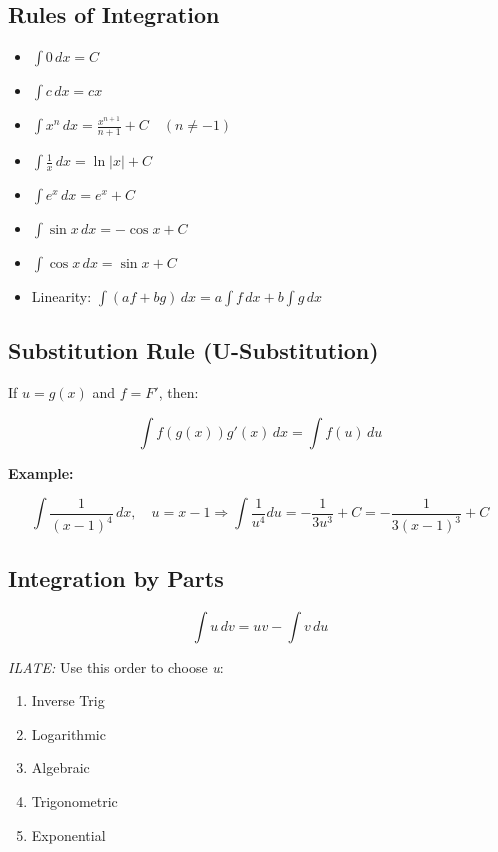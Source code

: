 \subsection{Rules of Integration}

\begin{itemize}

    \item \(\int 0\,dx = C\)

    \item \(\int c\,dx = cx\)

    \item \(\int x^n\,dx = \frac{x^{n+1}}{n+1} + C \quad (n \ne -1)\)

    \item \(\int \frac{1}{x}\,dx = \ln|x| + C\)

    \item \(\int e^x\,dx = e^x + C\)

    \item \(\int \sin x\,dx = -\cos x + C\)

    \item \(\int \cos x\,dx = \sin x + C\)

    \item Linearity: \(\int (af + bg)\,dx = a\int f\,dx + b\int g\,dx\)

\end{itemize}

\subsection{Substitution Rule (U-Substitution)}

If \(u = g(x)\) and \(f = F'\), then:

\[
    \int f(g(x))g'(x)\,dx = \int f(u)\,du
\]

\textbf{Example:}
\vspace{\baselineskip}

\[
    \int \frac{1}{{(x - 1)}^4}\,dx, \quad u = x - 1 \Rightarrow \int \frac{1}{u^4} du = -\frac{1}{3u^3} + C = -\frac{1}{3{(x - 1)}^3} + C
\]

\subsection{Integration by Parts}

\[
    \int u\,dv = uv - \int v\,du
\]

\emph{ILATE:} Use this order to choose \emph{u}:

\begin{enumerate}

    \item Inverse Trig

    \item Logarithmic

    \item Algebraic

    \item Trigonometric

    \item Exponential

\end{enumerate}

